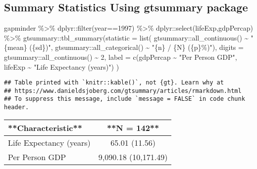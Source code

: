 \documentclass[
]{book}
\newenvironment{Shaded}{\begin{snugshade}}{\end{snugshade}}
\newcommand{\AttributeTok}[1]{\textcolor[rgb]{0.77,0.63,0.00}{#1}}
\newcommand{\DecValTok}[1]{\textcolor[rgb]{0.00,0.00,0.81}{#1}}
\newcommand{\FunctionTok}[1]{\textcolor[rgb]{0.00,0.00,0.00}{#1}}
\newcommand{\NormalTok}[1]{#1}
\newcommand{\SpecialCharTok}[1]{\textcolor[rgb]{0.00,0.00,0.00}{#1}}
\newcommand{\StringTok}[1]{\textcolor[rgb]{0.31,0.60,0.02}{#1}}
\begin{document}
\hypertarget{summary-statistics-using-gtsummary-package}{%
\subsection{Summary Statistics Using gtsummary package}\label{summary-statistics-using-gtsummary-package}}

\begin{Shaded}
\begin{Highlighting}[]
\NormalTok{gapminder }\SpecialCharTok{\%\textgreater{}\%} 
\NormalTok{  dplyr}\SpecialCharTok{::}\FunctionTok{filter}\NormalTok{(year}\SpecialCharTok{==}\DecValTok{1997}\NormalTok{) }\SpecialCharTok{\%\textgreater{}\%}  
\NormalTok{  dplyr}\SpecialCharTok{::}\FunctionTok{select}\NormalTok{(lifeExp,gdpPercap) }\SpecialCharTok{\%\textgreater{}\%}
\NormalTok{  gtsummary}\SpecialCharTok{::}\FunctionTok{tbl\_summary}\NormalTok{(}\AttributeTok{statistic =} \FunctionTok{list}\NormalTok{(}
\NormalTok{      gtsummary}\SpecialCharTok{::}\FunctionTok{all\_continuous}\NormalTok{() }\SpecialCharTok{\textasciitilde{}} \StringTok{"\{mean\} (\{sd\})"}\NormalTok{,}
\NormalTok{      gtsummary}\SpecialCharTok{::}\FunctionTok{all\_categorical}\NormalTok{() }\SpecialCharTok{\textasciitilde{}} \StringTok{"\{n\} / \{N\} (\{p\}\%)"}\NormalTok{),}
    \AttributeTok{digits =}\NormalTok{ gtsummary}\SpecialCharTok{::}\FunctionTok{all\_continuous}\NormalTok{() }\SpecialCharTok{\textasciitilde{}} \DecValTok{2}\NormalTok{,}
    \AttributeTok{label =} \FunctionTok{c}\NormalTok{(gdpPercap }\SpecialCharTok{\textasciitilde{}} \StringTok{"Per Person GDP"}\NormalTok{,}
\NormalTok{              lifeExp }\SpecialCharTok{\textasciitilde{}} \StringTok{"Life Expectancy (years)"}\NormalTok{)}
\NormalTok{  )}
\end{Highlighting}
\end{Shaded}

\begin{verbatim}
## Table printed with `knitr::kable()`, not {gt}. Learn why at
## https://www.danieldsjoberg.com/gtsummary/articles/rmarkdown.html
## To suppress this message, include `message = FALSE` in code chunk header.
\end{verbatim}

\begin{tabular}{l|c}
\hline
**Characteristic** & **N = 142**\\
\hline
Life Expectancy (years) & 65.01 (11.56)\\
\hline
Per Person GDP & 9,090.18 (10,171.49)\\
\hline
\end{tabular}
\end{document}

